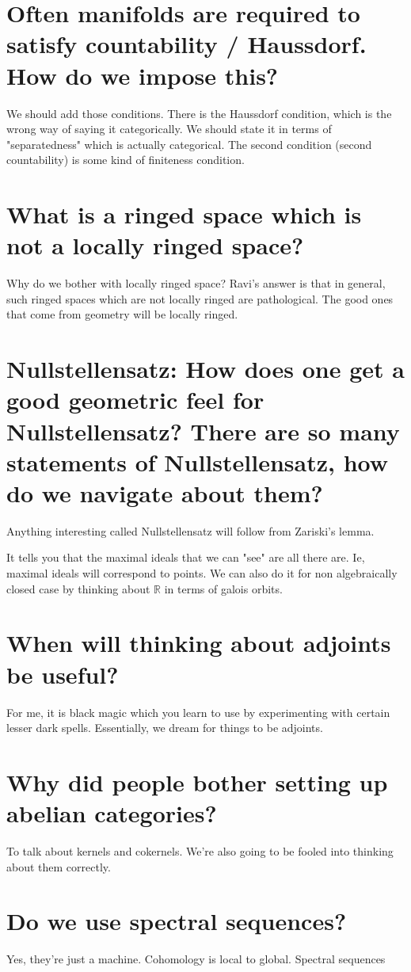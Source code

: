 \documentclass{book}
\newcommand{\R}{\ensuremath{\mathbb{R}}}
\theoremstyle{definition}
\begin{document}
\section{Often manifolds are required to satisfy countability / Haussdorf. How do we impose this?}
We should add those conditions. There is the Haussdorf condition, which is the wrong
way of saying it categorically. We should state it in terms of "separatedness" which
is actually categorical. The second condition (second countability) is some kind
of finiteness condition.

\section{What is a ringed space which is not a locally ringed space?}
Why do we bother with locally ringed space? Ravi's answer is that in general,
such ringed spaces which are not locally ringed are pathological. The good ones
that come from geometry will be locally ringed.

\section{Nullstellensatz: How does one get a good geometric feel for Nullstellensatz? There are so many statements of Nullstellensatz,
how do we navigate about them?}

Anything interesting called Nullstellensatz will follow from Zariski's lemma.

It tells you that the maximal ideals that we can "see" are all there are. Ie, maximal
ideals will correspond to points. We can also do it for non algebraically closed
case by thinking about $\R$ in terms of galois orbits.


\section{When will thinking about adjoints be useful?}
For me, it is black magic which you learn to use by experimenting with certain
lesser dark spells. Essentially, we dream for things to be adjoints.

\section{Why did people bother setting up abelian categories?}
To talk about kernels and cokernels. We're also going to be fooled into
thinking about them correctly.

\section{Do we use spectral sequences?}
Yes, they're just a machine. Cohomology is local to global. Spectral sequences
\end{document}
